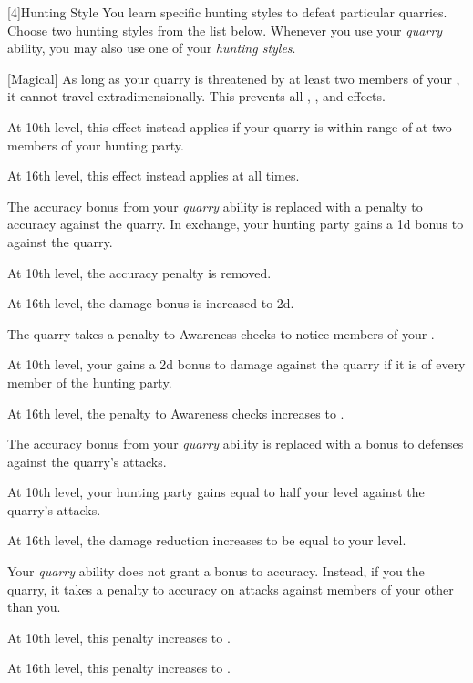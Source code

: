         [4]{Hunting Style}
        You learn specific hunting styles to defeat particular quarries.
        Choose two hunting styles from the list below.
        Whenever you use your \textit{quarry} ability, you may also use one of your \textit{hunting styles}.
        {
            [Magical]
            As long as your quarry is threatened by at least two members of your , it cannot travel extradimensionally.
            This prevents all , , and  effects.
            \par At 10th level, this effect instead applies if your quarry is within \rngmed range of at two members of your hunting party.
            \par At 16th level, this effect instead applies at all times.

            The accuracy bonus from your \textit{quarry} ability is replaced with a  penalty to accuracy against the quarry.
            In exchange, your hunting party gains a \plus1d bonus to  against the quarry.
            \par At 10th level, the accuracy penalty is removed.
            \par At 16th level, the damage bonus is increased to \plus2d.

            The quarry takes a  penalty to Awareness checks to notice members of your .
            \par At 10th level, your  gains a \plus2d bonus to damage against the quarry if it is \unaware of every member of the hunting party.
            \par At 16th level, the penalty to Awareness checks increases to .

            The accuracy bonus from your \textit{quarry} ability is replaced with a  bonus to defenses against the quarry's attacks.
            \par At 10th level, your hunting party gains  equal to half your level against the quarry's attacks.
            \par At 16th level, the damage reduction increases to be equal to your level.

            Your \textit{quarry} ability does not grant a bonus to accuracy.
            Instead, if you  the quarry, it takes a  penalty to accuracy on attacks against members of your  other than you.
            \par At 10th level, this penalty increases to .
            \par At 16th level, this penalty increases to .

}
